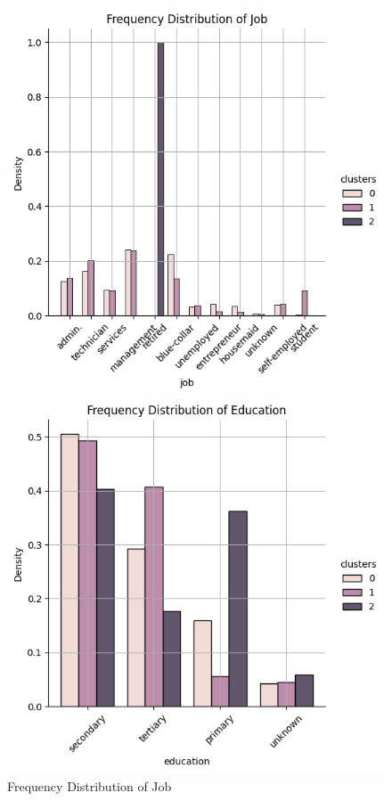 \documentclass[12pt]{article}
\begin{document}
\begin{enumerate}
\begin{enumerate}[label=\alph*)]
        \begin{figure}[h]
            \centering
            \captionsetup{font=footnotesize} 
            \begin{minipage}{0.43\textwidth}
                \centering
                \includegraphics[width=\textwidth]{./Part II/2_c_1.png}
                \caption{Frequency Distribution of Job}
            \end{minipage}
            \begin{minipage}{0.43\textwidth}
                \centering
                \includegraphics[width=\textwidth]{./Part II/2_c_2.png}

\end{minipage}
\end{figure}
\end{enumerate}
\end{enumerate}
\end{document}
